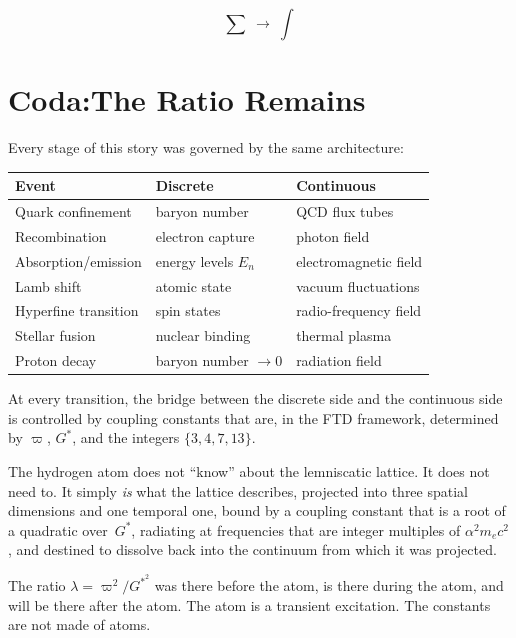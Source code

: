 \documentclass[11pt,a4paper]{article}
\newcommand{\Gstar}{G^{*}}
\newcommand{\vpi}{\varpi}
\begin{document}
\[
\sum \;\longrightarrow\; \int
\]

\section*{Coda:\quad The Ratio Remains}

Every stage of this story was governed by the same architecture:

\bigskip
\begin{center}
\begin{tabular}{lll}
\toprule
\textbf{Event} & \textbf{Discrete} & \textbf{Continuous}\\
\midrule
Quark confinement & baryon number & QCD flux tubes\\
Recombination & electron capture & photon field\\
Absorption/emission & energy levels $E_n$ & electromagnetic field\\
Lamb shift & atomic state & vacuum fluctuations\\
Hyperfine transition & spin states & radio-frequency field\\
Stellar fusion & nuclear binding & thermal plasma\\
Proton decay & baryon number $\to 0$ & radiation field\\
\bottomrule
\end{tabular}
\end{center}
\bigskip

At every transition, the bridge between the discrete side and the continuous
side is controlled by coupling constants that are, in the FTD framework,
determined by $\vpi$, $\Gstar$, and the integers $\{3,4,7,13\}$.

The hydrogen atom does not ``know'' about the lemniscatic lattice.  It does
not need to.  It simply \emph{is} what the lattice describes, projected into
three spatial dimensions and one temporal one, bound by a coupling constant
that is a root of a quadratic over~$\Gstar$, radiating at frequencies that
are integer multiples of $\alpha^2 m_e c^2$, and destined to dissolve back
into the continuum from which it was projected.

The ratio $\lambda=\vpi^2/\Gstar^2$ was there before the atom, is there
during the atom, and will be there after the atom.  The atom is a transient
excitation.  The constants are not made of atoms.
\end{document}
